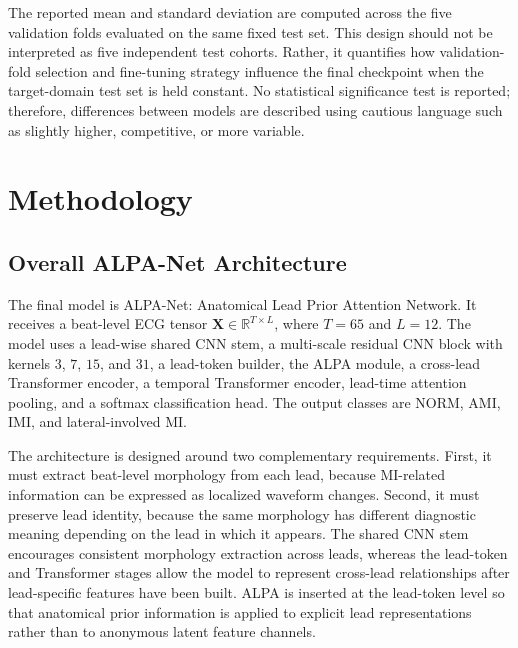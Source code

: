 \documentclass[a4paper,fleqn]{cas-dc}
\begin{document}
The reported mean and standard deviation are computed across the five validation folds evaluated on
the same fixed test set. This design should not be interpreted as five independent test cohorts.
Rather, it quantifies how validation-fold selection and fine-tuning strategy influence the final
checkpoint when the target-domain test set is held constant. No statistical significance test is
reported; therefore, differences between models are described using cautious language such as
slightly higher, competitive, or more variable.

\section{Methodology}
\subsection{Overall ALPA-Net Architecture}
The final model is ALPA-Net: Anatomical Lead Prior Attention Network. It receives a beat-level ECG
tensor $\mathbf{X}\in\mathbb{R}^{T\times L}$, where $T=65$ and $L=12$. The model uses a lead-wise
shared CNN stem, a multi-scale residual CNN block with kernels $3$, $7$, $15$, and $31$, a
lead-token builder, the ALPA module, a cross-lead Transformer encoder, a temporal Transformer
encoder, lead-time attention pooling, and a softmax classification head. The output classes are
NORM, AMI, IMI, and lateral-involved MI.

The architecture is designed around two complementary requirements. First, it must extract
beat-level morphology from each lead, because MI-related information can be expressed as localized
waveform changes. Second, it must preserve lead identity, because the same morphology has different
diagnostic meaning depending on the lead in which it appears. The shared CNN stem encourages
consistent morphology extraction across leads, whereas the lead-token and Transformer stages allow
the model to represent cross-lead relationships after lead-specific features have been built. ALPA
is inserted at the lead-token level so that anatomical prior information is applied to explicit lead
representations rather than to anonymous latent feature channels.
\end{document}
